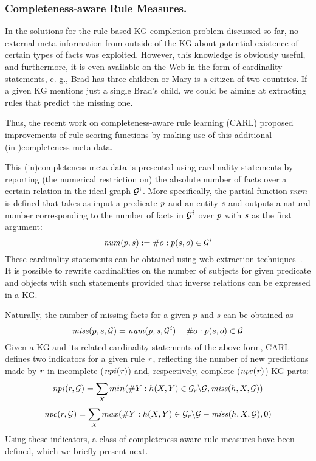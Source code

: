 \subsubsection{Completeness-aware Rule Measures.}  
In the solutions for the rule-based KG completion problem discussed so far, no external meta-information from outside of the KG about potential existence of certain types of facts was exploited. However, this knowledge is obviously useful, and furthermore, it is even available on the Web
in the form of cardinality statements, e. g., Brad has three children or Mary is a citizen of two countries. If a given KG mentions just a single Brad's child, we could be aiming at extracting rules that predict the missing
one.

Thus, the recent work on completeness-aware rule learning (CARL) \cite{carl} proposed improvements of rule scoring functions by making use of this additional (in-)completeness meta-data.

This (in)completeness meta-data is presented using cardinality statements by reporting (the numerical restriction on) the absolute number of facts over a certain relation in the ideal graph $\mathcal{G}^i$. More specifically, the partial function $num$ is defined that takes as input a predicate $\mathit{p}$ and an entity $\mathit{s}$ and outputs a natural number corresponding to the number of facts in $\mathcal{G}^i$ over $\mathit{p}$ with $\mathit{s}$ as the first argument: 
\begin{equation}\label{eq:num}
\mathit{num}(p,s) := \# o : p(s,o) \in \mathcal{G}^i 
\end{equation}
These cardinality statements can be obtained using web extraction techniques~\cite{cardinality-extraction-iswc-2016}.
It is possible to rewrite cardinalities on the number of subjects for given predicate and objects with such statements provided that inverse relations can be expressed in a KG.

Naturally, the number of missing facts for a given $p$ and $s$ can be obtained as
\[\mathit{miss}(p,s,\mathcal{G}) = \mathit{num(p,s,\mathcal{G}^i)} - \#o : p(s,o) \in \mathcal{G}\]
Given a KG and its related cardinality statements of the above form, CARL defines two indicators for a given rule $\mathit{r}$, reflecting the number of new 
predictions made by $\mathit{r}$ in incomplete ($\mathit{npi(r)}$) and, respectively, complete ($\mathit{npc(r)}$) KG parts:
\begin{align*}
\mathit{npi}(r, \mathcal{G}) = \sum_X min(\#Y: h(X,Y)\in \mathcal{G}_r\backslash \mathcal{G}, \mathit{miss}(h,X,\mathcal{G}))
\end{align*}
\vspace{-\topsep}
\vspace{-\topsep}
\begin{align*}
\mathit{npc}(r, \mathcal{G}) = \sum_X max(\#Y: h(X,Y)\in\mathcal{G}_r\backslash \mathcal{G} - \mathit{miss}(h,X,\mathcal{G}), 0)
\end{align*}
Using these indicators, a class of completeness-aware rule measures have been defined, which we briefly present next.
% 

